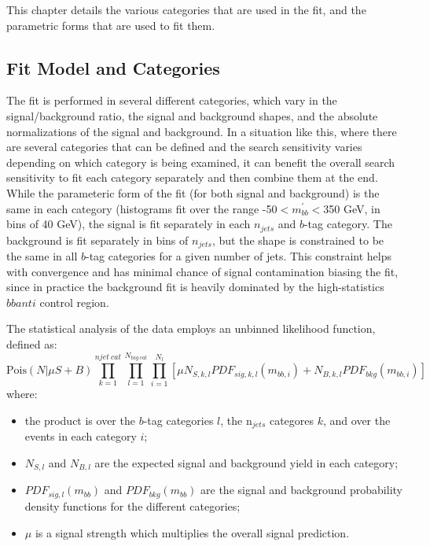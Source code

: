 This chapter details the various categories that are used in the fit, and
the parametric forms that are used to fit them.   

\subsection{Fit Model and Categories}
\label{subsec:fitmodel}
The fit is performed in several different categories, which vary in the 
signal/background ratio, the signal and background shapes, and the
absolute normalizations of the signal and background.  In a situation like
this, where there are several categories that can be defined and the
search sensitivity varies depending on which category is being examined,
it can benefit the overall search sensitivity to fit each category 
separately and then combine them at the end.  While the parameteric form
of the fit (for both signal and background) is the same in each category (histograms fit over the range
-50$<m_{bb}^{'}<$350 GeV, in bins of 40 GeV), the signal is fit separately
in each $n_{jets}$ and $b$-tag category.  The background is fit
separately in bins of $n_{jets}$, but the shape is constrained to be the
same in all $b$-tag categories for a given number of jets.  This constraint
helps with convergence and has minimal chance of signal contamination
biasing the fit, since in practice the background fit is heavily dominated
by the high-statistics $bbanti$ control region.

The statistical analysis of the data employs an unbinned likelihood
function, defined as:
\begin{equation}
\text{Pois}(N|\mu S+B) \prod_{k=1}^{njet\ cat} \prod_{l=1}^{N_{tag\ cat}} \prod_{i=1}^{N_{l}} \left[ \mu N_{S,k,l} PDF_{sig,k,l}(m_{bb,i}) + N_{B,k,l} PDF_{bkg}(m_{bb,i}) \right]
\end{equation}
where:
\begin{itemize}
\item the product is over the $b$-tag categories $l$, the n$_{jets}$ categores $k$, and over the events in each category $i$;
\item $N_{S,l}$ and $N_{B,l}$ are the expected signal and background yield in each category;
\item $PDF_{sig,l}(m_{bb})$ and $PDF_{bkg}(m_{bb})$ are the signal and background probability density functions for  the different categories;
\item $\mu$ is a signal strength which multiplies the overall signal prediction.
\end{itemize}


